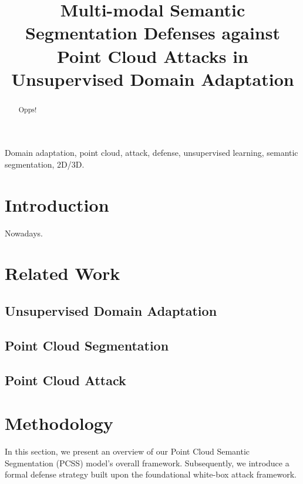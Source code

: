 \documentclass[conference]{IEEEtran}
\begin{document}
\title{Multi-modal Semantic Segmentation Defenses against Point Cloud Attacks in Unsupervised Domain Adaptation\\
}

\author{



}

\maketitle

\begin{abstract}
Opps!
\end{abstract}

\begin{IEEEkeywords}
Domain adaptation, point cloud, attack, defense, unsupervised learning, semantic segmentation, 2D/3D.
\end{IEEEkeywords}

\section{Introduction}
Nowadays. 

\section{Related Work}

\subsection{Unsupervised Domain Adaptation}

\subsection{Point Cloud Segmentation}

\subsection{Point Cloud Attack}



\section{Methodology}
In this section, we present an overview of our Point Cloud Semantic Segmentation (PCSS) model's overall framework. Subsequently, we introduce a formal defense strategy built upon the foundational white-box attack framework.
\end{document}
